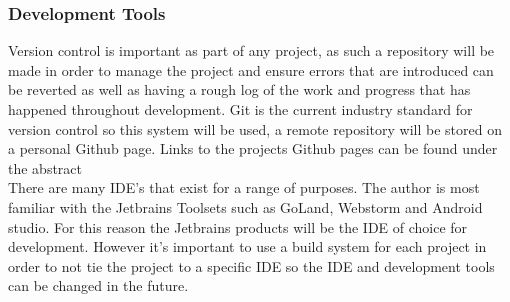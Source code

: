 \subsubsection{Development Tools}
Version control is important as part of any project, as such a repository will be made in order to manage the project and ensure errors that are introduced can be reverted as well as having a rough log of the work and progress that has happened throughout development. Git is the current industry standard for version control so this system will be used, a remote repository will be stored on a personal Github page. Links to the projects Github pages can be found under the abstract\\

There are many IDE's that exist for a range of purposes. The author is most familiar with the Jetbrains Toolsets such as GoLand, Webstorm and Android studio. For this reason the Jetbrains products will be the IDE of choice for development. However it's important to use a build system for each project in order to not tie the project to a specific IDE so the IDE and development tools can be changed in the future.


